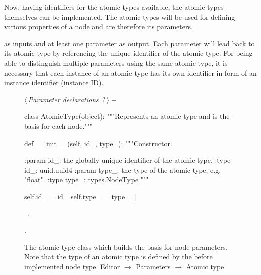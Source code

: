 \documentclass[%
    a4paper,    %
    justified,  %
    nobib,      %
    openany     %
]{tufte-book}
\makeatletter
\renewcommand{\label}[1]{\@tufte@label{##1}}%
\makeatother
\begin{document}
Now, having identifiers for the atomic types available, the atomic types
themselves can be implemented. The atomic types will be used for defining
various properties of a node and are therefore its parameters.

 as inputs and at least
one parameter as output. Each parameter will lead back to its atomic type by
referencing the unique identifier of the atomic type. For being able to
distinguish multiple parameters using the same atomic type, it is necessary that
each instance of an atomic type has its own identifier in form of an instance
identifier (instance ID).

\begin{figure}
\begin{flushleft} \small
\begin{minipage}{\linewidth}\label{scrap64}\raggedright\small
{} $\langle\,${\itshape Parameter declarations}\nobreak\ {\footnotesize {?}}$\,\rangle\equiv$
\vspace{-1ex}
\begin{pythoncode}
class AtomicType(object):
    """Represents an atomic type and is the basis for each node."""

    def __init__(self, id_, type_):
        """Constructor.

        :param id_: the globally unique identifier of the atomic type.
        :type  id_: uuid.uuid4
        :param type_: the type of the atomic type, e.g. "float".
        :type  type_: types.NodeType
        """

        self.id_   = id_
        self.type_ = type_
|\NWsep|
\end{pythoncode}
\vspace{1.5ex}
\footnotesize
\begin{list}{}{\setlength{\itemsep}{-\parsep}\setlength{\itemindent}{-\leftmargin}}
\item \NWtxtMacroDefBy\ .
\item {\NWtxtMacroNoRef}.

\item{}
\end{list}
\end{minipage}\vspace{4ex}
\end{flushleft}
\caption{The atomic type class which builds the basis for node parameters. Note
  that the type of an atomic type is defined by the before implemented node
  type.
  \newline{}\newline{}Editor $\rightarrow$ Parameters $\rightarrow$ Atomic type}
\label{editor:lst:parameters:atomic-type}
\end{figure}
\end{document}

